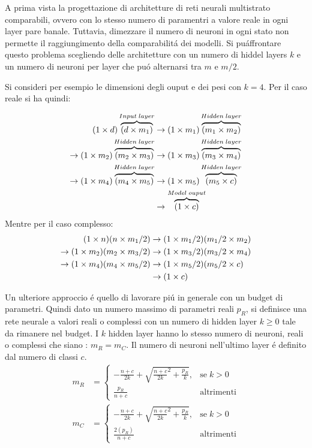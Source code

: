 \documentclass[a4paper,12pt]{report}
\begin{document}
 A prima vista la progettazione di architetture di reti neurali multistrato comparabili, ovvero con lo stesso numero di paramentri a valore reale in ogni layer pare banale. 
 Tuttavia, dimezzare il numero di neuroni in ogni stato non permette il raggiungimento della comparabilit\'a dei modelli. 
 Si pu\' affrontare questo problema scegliendo delle architetture con un numero di hiddel layers $k$ e un numero di neuroni per layer che pu\'o alternarsi tra $m$ e $m/2$. 
 
 Si consideri per esempio le dimensioni degli ouput e dei pesi con $k=4$. Per il caso reale si ha quindi:
 
\begin{align}
  (1 \times d)\overbrace{(d \times m_1)}^{Input \; layer} &\to (1 \times m_1)\overbrace{(m_1 \times m_2)}^{Hidden \; layer} \\
  \to (1 \times m_2)\overbrace{(m_2 \times m_3)}^{Hidden \; layer} &\to (1 \times m_3)\overbrace{(m_3 \times m_4)}^{Hidden \; layer} \notag \\
  \to (1 \times m_4)\overbrace{(m_4 \times m_5)}^{Hidden \; layer} &\to (1 \times m_5)\overbrace{(m_5 \times c)}^{Hidden \; layer} \notag \\
  &\to \overbrace{(1 \times c)}^{Model \; ouput} \notag
 \end{align}
Mentre per il caso complesso:
 \begin{align}
  (1 \times n)(n \times m_1/2) &\to (1 \times m_1/2)(m_1/2 \times m_2)\\
  \to (1 \times m_2)(m_2 \times m_3/2) &\to (1 \times m_3/2)(m_3/2 \times m_4) \notag \\
  \to (1 \times m_4)(m_4 \times m_5/2) &\to (1 \times m_5/2)(m_5/2 \times c) \notag \\
  &\to (1 \times c) \notag
 \end{align}
 
 Un ulteriore approccio \'e quello di lavorare pi\'u in generale con un budget di parametri. 
 Quindi dato un numero massimo di parametri reali $p_R$, si definisce una rete neurale a valori reali o complessi con un numero di hidden layer $k \ge 0$ tale da rimanere nel budget. 
 I $k$ hidden layer hanno lo stesso numero di neuroni, reali o complessi che siano : $m_R = m_C$. Il numero di neuroni nell'ultimo layer \'e definito dal numero di classi $c$.
 \begin{align}
  m_R &= \begin{cases}
          -\frac{n+c}{2k} + \sqrt{ \frac{n+c}{2k}^2 + \frac{p_R}{k}}, & \mbox{se} \; k>0\\
          \frac{p_R}{n+c} & \mbox{altrimenti}
         \end{cases} \label{LastLayerR}\\
  m_C &= \begin{cases}
          -\frac{n+c}{2k} + \sqrt{ \frac{n+c}{2k}^2 + \frac{p_R}{k}}, & \mbox{se} \; k>0\\
          \frac{2(p_R)}{n+c} & \mbox{altrimenti}
         \end{cases} \label{LastLayerC}
 \end{align}
\end{document}
